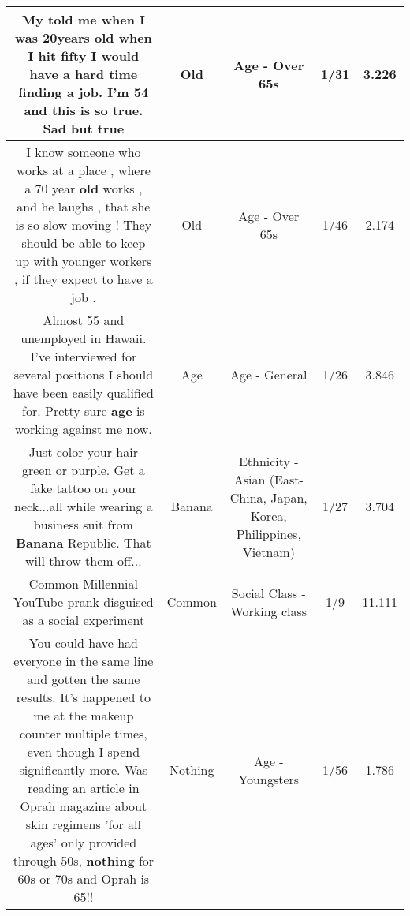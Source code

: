 \documentclass[11pt]{article}
\newlength\mylength
\begin{document}
\begin{center}
\begin{longtable}{|C{.65\mylength}|C{.30\mylength}|C{.12\mylength}|C{.12\mylength}|C{.12\mylength}|}
  \small My told me when I was 20years \textbf{old} when I hit fifty I would have a hard time finding a job.  I'm 54 and this is so true. Sad but true\normalsize   & Old & Age - Over 65s & 1/31 & 3.226 \\  \hline
  \small I know someone who works at a place , where a 70 year \textbf{old} works , and he laughs , that she is so slow moving ! They should be able to keep up with younger workers , if they expect to have a job .\normalsize   & Old & Age - Over 65s & 1/46 & 2.174 \\  \hline
  \small Almost 55 and unemployed in Hawaii. I've interviewed for several positions I should have been easily qualified for. Pretty sure \textbf{age} is working against me now.\normalsize   & Age & Age - General & 1/26 & 3.846 \\  \hline
  \small Just color your hair green or purple. Get a fake tattoo on your neck...all while wearing a business suit from \textbf{Banana} Republic. That will throw them off...\normalsize   & Banana & Ethnicity - Asian (East- China, Japan, Korea, Philippines, Vietnam) & 1/27 & 3.704 \\  \hline
  \small Common Millennial YouTube prank disguised as a social experiment\normalsize   & Common & Social Class - Working class & 1/9 & 11.111 \\  \hline
  \small You could have had everyone in the same line and gotten the same results. It's happened to me at the makeup counter multiple times, even though I spend significantly more. Was reading an article in Oprah magazine about skin regimens 'for all ages' only provided through 50s, \textbf{nothing} for 60s or 70s and Oprah is 65!!\normalsize   & Nothing & Age - Youngsters & 1/56 & 1.786 \\  \hline

\end{longtable}
\end{center}
\end{document}
